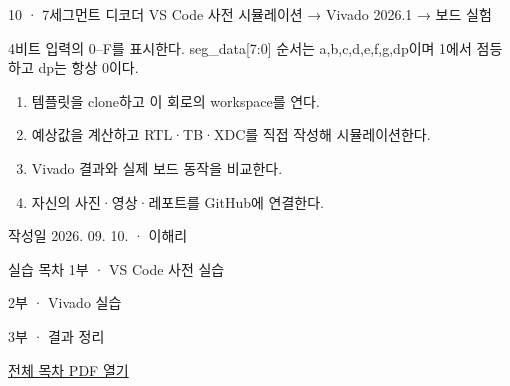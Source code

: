 
\renewcommand{\labonehome}{\hyperlink{modern-10-contents}{\contentsbutton}}
\renewcommand{\legacySource}[1]{}
\providecommand{\terminalbox}[1]{\par\vspace{0.15cm}{\setlength{\fboxsep}{7pt}\colorbox{black}{\parbox{\dimexpr\textwidth-14pt\relax}{\color{white}\ttfamily\fontsize{7}{9}\selectfont #1}}}\par\vspace{0.15cm}}

\begingroup
\renewcommand{\small}{\fontsize{9}{11}\selectfont}
\begin{frame}{10 · 7세그먼트 디코더}\relax
\small
VS Code 사전 시뮬레이션 → Vivado 2026.1 → 보드 실험\par\vspace{0.22cm}4비트 입력의 0–F를 표시한다. seg\_data[7:0] 순서는 a,b,c,d,e,f,g,dp이며 1에서 점등하고 dp는 항상 0이다.\par\begin{enumerate}\setlength{\itemsep}{0.22cm}
\item 템플릿을 clone하고 이 회로의 workspace를 연다.
\item 예상값을 계산하고 RTL·TB·XDC를 직접 작성해 시뮬레이션한다.
\item Vivado 결과와 실제 보드 동작을 비교한다.
\item 자신의 사진·영상·레포트를 GitHub에 연결한다.
\end{enumerate}
작성일 2026. 09. 10. · 이해리\par
\end{frame}

\begin{frame}[label=modern-10-contents]{실습 목차}\relax
\small
1부 · VS Code 사전 실습\par{}\par\vspace{0.2cm}
\par\vspace{0.4cm}
2부 · Vivado 실습\par{}\par\vspace{0.4cm}
3부 · 결과 정리\par{}\par\vspace{0.35cm}
\href{04.LAB1_00_CONTENTS.pdf}{전체 목차 PDF 열기}
\end{frame}

